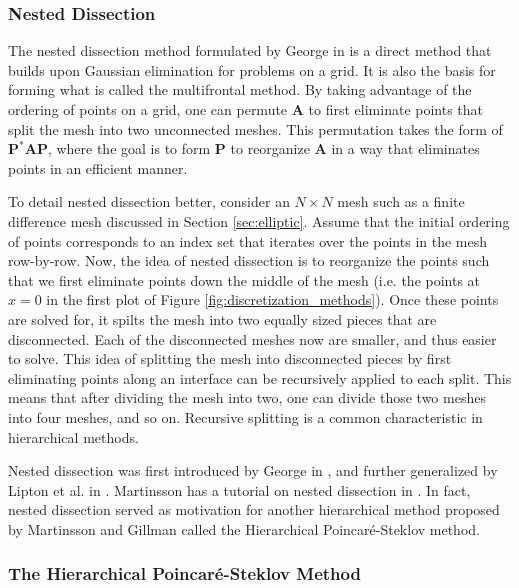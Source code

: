\subsubsection{Nested Dissection}
\label{subsub:nested-dissection}

The nested dissection method formulated by George in \citep{george1973nested} is a direct method that builds upon Gaussian elimination for problems on a grid. It is also the basis for forming what is called the multifrontal method. By taking advantage of the ordering of points on a grid, one can permute $\textbf{A}$ to first eliminate points that split the mesh into two unconnected meshes. This permutation takes the form of $\textbf{P}^* \textbf{A} \textbf{P}$, where the goal is to form $\textbf{P}$ to reorganize $\textbf{A}$ in a way that eliminates points in an efficient manner.

To detail nested dissection better, consider an $N \times N$ mesh such as a finite difference mesh discussed in Section \ref{sec:elliptic}. Assume that the initial ordering of points corresponds to an index set that iterates over the points in the mesh row-by-row. Now, the idea of nested dissection is to reorganize the points such that we first eliminate points down the middle of the mesh (i.e. the points at $x = 0$ in the first plot of Figure \ref{fig:discretization_methods}). Once these points are solved for, it spilts the mesh into two equally sized pieces that are disconnected. Each of the disconnected meshes now are smaller, and thus easier to solve. This idea of splitting the mesh into disconnected pieces by first eliminating points along an interface can be recursively applied to each split. This means that after dividing the mesh into two, one can divide those two meshes into four meshes, and so on. Recursive splitting is a common characteristic in hierarchical methods.

Nested dissection was first introduced by George in \citep{george1973nested}, and further generalized by Lipton et al. in \citep{lipton1979generalized}. Martinsson has a tutorial on nested dissection in \citep{martinsson2019fast}. In fact, nested dissection served as motivation for another hierarchical method proposed by Martinsson and Gillman called the Hierarchical Poincaré-Steklov method.

\subsubsection{The Hierarchical Poincaré-Steklov Method}
\label{subsub:hps-method}

